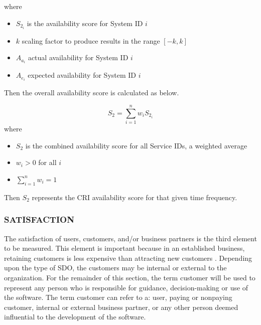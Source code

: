 \documentclass[SDSUThesis.tex]{subfiles}
\begin{document}
                where
                
                \begin{itemize}
                    \item $S_{2_i}$ is the availability score for System ID $i$
                    \item $k$ scaling factor to produce results in the range $[-k,k]$
                    \item $A_{a_i}$ actual availability for System ID $i$
                    \item $A_{e_i}$ expected availability for System ID $i$
                \end{itemize}
                
                Then the overall availability score is calculated as below.
                
                \[
                    S_{2} = \sum\limits^n_{i=1} w_i S_{2_i} 
                \]
                where
                \begin{itemize}
                    \item $S_2$ is the combined availability score for all Service IDs, 
                    a weighted average
                    \item $w_i > 0$ for all $i$
                    \item $\sum\limits^n_{i=1} w_i = 1$
                \end{itemize}
                
                Then $S_2$ represents the CRI availability score for that given time 
                frequency.
                
        \subsubsection{SATISFACTION}
            The satisfaction of users, customers, and/or business partners is 
            the third element to be measured.  This element is important because 
            in an established business, retaining customers is less expensive
            than attracting new customers \cite{Aulet2013}.  
            Depending upon the type of SDO,
            the customers may be internal or external to the organization.  For
            the remainder of this section, the term customer will be used
            to represent any person who is responsible for guidance, decision-making
            or use of the software.  The term customer can refer to a: user, paying or nonpaying
            customer, internal or external business partner, or any other person deemed influential
            to the development of the software.
            
\end{document}
